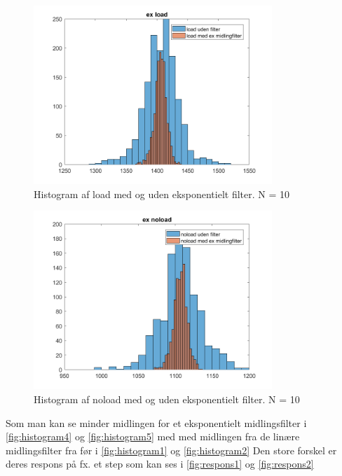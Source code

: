 \documentclass[12pt]{article}
\begin{document}
\begin{figure}[H]
	\centering
	\includegraphics[width=90mm]{Img/Histogram_load_ex10.png}
	\caption{Histogram af load med og uden eksponentielt filter. N = 10}
	\label{fig:histogram4}
\end{figure}


\begin{figure}[H]
	\centering
	\includegraphics[width=90mm]{Img/Histogram_noload_ex10.png}
	\caption{Histogram af noload med og uden eksponentielt filter. N = 10}
	\label{fig:histogram5}
\end{figure}

Som man kan se minder midlingen  for et eksponentielt midlingsfilter i \autoref{fig:histogram4} og \autoref{fig:histogram5} med med midlingen fra de linære midlingsfilter fra før i \autoref{fig:histogram1} og \autoref{fig:histogram2}
\newline
Den store forskel er deres respons på fx. et step som kan ses i \autoref{fig:respons1} og \autoref{fig:respons2}
\end{document}
